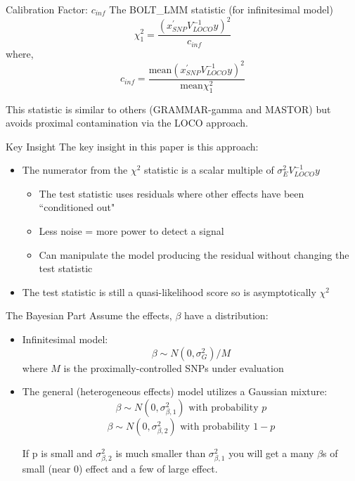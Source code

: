 \documentclass[aspectratio=169]{beamer}\usepackage[]{graphicx}\usepackage[]{color}
\begin{document}
\begin{frame}{Calibration Factor: $c_{inf}$}
The BOLT\_LMM statistic (for infinitesimal model)
$$\chi^2_1 = \frac{\left( x^{\prime}_{SNP}V^{-1}_{LOCO}y\right)^2}{c_{inf}}$$
where, 
$$c_{inf} = \frac{\text{mean}\left(x^{\prime}_{SNP}V^{-1}_{LOCO}y\right)^2}{\text{mean}\chi^2_1}$$

This statistic is similar to others (GRAMMAR-gamma and MASTOR) but avoids proximal contamination via the LOCO approach.
\end{frame}

\begin{frame}{Key Insight}
The key insight in this paper is this approach:
\smallskip
\begin{itemize}
\item The numerator from the $\chi^2$ statistic is a scalar multiple of $\sigma^2_EV^{-1}_{LOCO}y$
\smallskip
\pause
\begin{itemize}
\item The test statistic uses residuals where other effects have been ``conditioned out"
\pause
\item Less noise = more power to detect a signal
\pause
\item Can manipulate the model producing the residual without changing the test statistic
\pause
\end{itemize}
\smallskip
\item The test statistic is still a quasi-likelihood score so is asymptotically $\chi^2$ 
\end{itemize}
\end{frame}

\begin{frame}{The Bayesian Part}
Assume the effects, $\beta$ have a distribution:
\begin{itemize}
\item Infinitesimal model:
$$\beta \sim N(0,\sigma^2_{G})/M$$
where $M$ is the proximally-controlled SNPs under evaluation
\pause
\smallskip
\item The general (heterogeneous effects) model utilizes a Gaussian mixture:
$$\beta \sim N(0,\sigma^2_{\beta,1}) \text{ with probability }p$$
$$\beta \sim N(0,\sigma^2_{\beta,2}) \text{ with probability }1-p$$

If p is small and $\sigma^2_{\beta,2}$ is much smaller than $\sigma^2_{\beta,1}$ you will get a many $\beta$s of small (near 0) effect and a few of large effect.
\end{itemize}
\end{frame}
\end{document}
